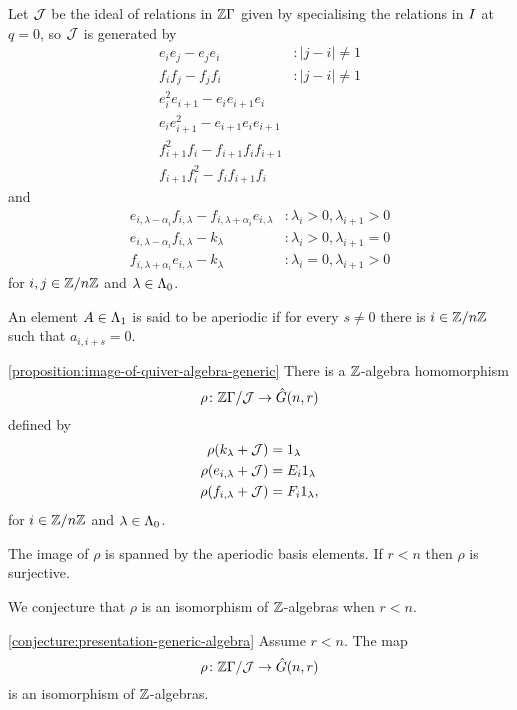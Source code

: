 \documentclass[a4paper, 11pt, twoside]{report}
\begin{document}
Let $\mathcal{J}$ be the ideal of relations in $\mathbb{Z}\Gamma$ given by specialising the relations in $I$ at $q=0$, so $\mathcal{J}$ is generated by
\begin{align*}
e_ie_j - e_je_i &: |j-i|\neq 1\\
f_if_j - f_jf_i &: |j-i|\neq 1\\
e_i^2e_{i+1} - e_ie_{i+1}e_i &\\
e_ie_{i+1}^2 - e_{i+1}e_ie_{i+1} &\\
f_{i+1}^2f_i - f_{i+1}f_if_{i+1} &\\
f_{i+1}f_i^2 - f_if_{i+1}f_i &
\end{align*}
and
\begin{align*}
e_{i,\lambda-\alpha_i}f_{i,\lambda} - f_{i,\lambda+\alpha_i}e_{i,\lambda} &: \lambda_i>0, \lambda_{i+1}>0\\
e_{i,\lambda-\alpha_i}f_{i,\lambda} - k_\lambda &: \lambda_i>0, \lambda_{i+1}=0\\
f_{i,\lambda+\alpha_i}e_{i,\lambda} - k_\lambda &: \lambda_i=0, \lambda_{i+1}>0
\end{align*}
for $i,j\in\mathbb{Z}/{n \mathbb{Z}}$ and $\lambda\in\Lambda_0{}$.

An element $A\in\Lambda_1{}$ is said to be aperiodic if for every $s\neq 0$ there is $i\in\mathbb{Z}/{n \mathbb{Z}}$ such that $a_{i,i+s}=0$.

\begin{proposition*}\ref{proposition:image-of-quiver-algebra-generic}
There is a $\mathbb{Z}$-algebra homomorphism
\begin{equation*}
\rho\colon\mathbb{Z}\Gamma/{\mathcal{J}}\to\hat{G}(n,r)
\end{equation*}
defined by
\begin{align*}
\rho(k_\lambda + \mathcal{J}) &= 1_\lambda\\
\rho(e_{i,\lambda} + \mathcal{J}) &= E_i1_\lambda\\
\rho(f_{i,\lambda} + \mathcal{J}) &= F_i1_\lambda,
\end{align*}
for $i\in\mathbb{Z}/{n \mathbb{Z}}$ and $\lambda\in\Lambda_0{}$.

The image of $\rho$ is spanned by the aperiodic basis elements. If $r<n$ then $\rho$ is surjective.
\end{proposition*}

We conjecture that $\rho$ is an isomorphism of $\mathbb{Z}$-algebras when $r<n$.

\begin{conjecture*}\ref{conjecture:presentation-generic-algebra}
Assume $r<n$. The map
\begin{equation*}
\rho\colon\mathbb{Z}\Gamma/{\mathcal{J}}\to\hat{G}(n,r)
\end{equation*}
is an isomorphism of $\mathbb{Z}$-algebras.
\end{conjecture*}
\end{document}
